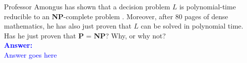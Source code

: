 \item{}
Professor Amongus has shown that a decision problem $L$ is polynomial-time
reducible to an {\bf NP}-complete problem . Moreover, after $80$ pages of dense
mathematics, he has also just proven that $L$ can be solved in polynomial time.
Has he just proven that {\bf P} = {\bf NP}? Why, or why not?\\[12pt]
\ifanswers
\textcolor{blue}{
\textbf{Answer:}\\[6pt]
Answer goes here
}
\newpage
\fi
